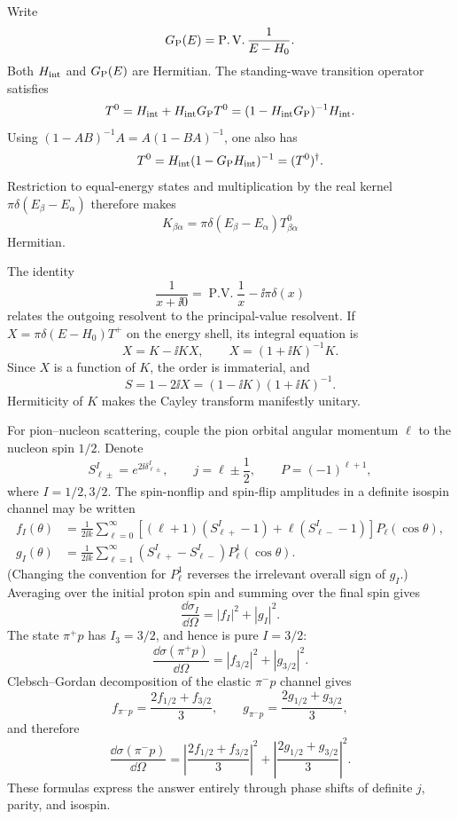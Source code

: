 \begin{enumerate}
Write
\[
 G_{\rm P}(E)=\operatorname{P.V.}\frac1{E-H_0}.
\]
Both \(H_{\rm int}\) and \(G_{\rm P}(E)\) are Hermitian.  The standing-wave
transition operator satisfies
\[
 T^0=H_{\rm int}+H_{\rm int}G_{\rm P}T^0
 =(1-H_{\rm int}G_{\rm P})^{-1}H_{\rm int}.
\]
Using
\((1-AB)^{-1}A=A(1-BA)^{-1}\), one also has
\[
 T^0=H_{\rm int}(1-G_{\rm P}H_{\rm int})^{-1}=(T^0)^\dagger.
\]
Restriction to equal-energy states and multiplication by the real kernel
\(\pi\delta(E_\beta-E_\alpha)\) therefore makes
\[
 K_{\beta\alpha}
 =\pi\delta(E_\beta-E_\alpha)T^0_{\beta\alpha}
\]
Hermitian.

The identity
\[
 \frac1{x+\ii0}=\operatorname{P.V.}\frac1x-\ii\pi\delta(x)
\]
relates the outgoing resolvent to the principal-value resolvent.  If
\(X=\pi\delta(E-H_0)T^+\) on the energy shell, its integral equation is
\[
 X=K-\ii KX,\qquad X=(1+\ii K)^{-1}K.
\]
Since \(X\) is a function of \(K\), the order is immaterial, and
\[
 \boxed{\quad S=1-2\ii X
 =(1-\ii K)(1+\ii K)^{-1}.\quad}
\]
Hermiticity of \(K\) makes the Cayley transform manifestly unitary.

For pion--nucleon scattering, couple the pion orbital angular momentum
\(\ell\) to the nucleon spin \(1/2\).  Denote
\[
 S_{\ell\pm}^{I}=e^{2\ii\delta_{\ell\pm}^{I}},\qquad
 j=\ell\pm\frac12,\qquad P=(-1)^{\ell+1},
\]
where \(I=1/2,3/2\).  The spin-nonflip and spin-flip amplitudes in a
definite isospin channel may be written
\[
 \begin{split}
 f_I(\theta)&=\frac1{2\ii k}\sum_{\ell=0}^\infty
 \left[(\ell+1)(S_{\ell+}^{I}-1)
 +\ell(S_{\ell-}^{I}-1)\right]P_\ell(\cos\theta),\\
 g_I(\theta)&=\frac1{2\ii k}\sum_{\ell=1}^\infty
 (S_{\ell+}^{I}-S_{\ell-}^{I})P_\ell^1(\cos\theta).
 \end{split}
\]
(Changing the convention for \(P_\ell^1\) reverses the irrelevant overall
sign of \(g_I\).)  Averaging over the initial proton spin and summing over
the final spin gives
\[
 \frac{\dd\sigma_I}{\dd\Omega}=|f_I|^2+|g_I|^2.
\]
The state \(\pi^+p\) has \(I_3=3/2\), and hence is pure \(I=3/2\):
\[
 \frac{\dd\sigma(\pi^+p)}{\dd\Omega}
 =|f_{3/2}|^2+|g_{3/2}|^2.
\]
Clebsch--Gordan decomposition of the elastic \(\pi^-p\) channel gives
\[
 f_{\pi^-p}=\frac{2f_{1/2}+f_{3/2}}3,\qquad
 g_{\pi^-p}=\frac{2g_{1/2}+g_{3/2}}3,
\]
and therefore
\[
 \frac{\dd\sigma(\pi^-p)}{\dd\Omega}
 =\left|\frac{2f_{1/2}+f_{3/2}}3\right|^2
 +\left|\frac{2g_{1/2}+g_{3/2}}3\right|^2.
\]
These formulas express the answer entirely through phase shifts of
definite \(j\), parity, and isospin.


\end{enumerate}
